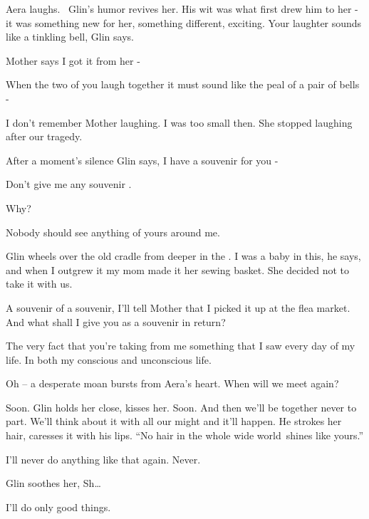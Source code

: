 \documentclass[letterpaper]{article}
\begin{document}
Aera laughs. ~Glin's humor revives her. His wit was what first drew him to her - it was something new for her, something
different, exciting. {\textquotedbl}Your laughter sounds like a tinkling bell,{\textquotedbl} Glin says.

{\textquotedbl}Mother says I got it from her -{\textquotedbl} 

{\textquotedbl}When the two of you laugh together it must sound like the peal of a pair of bells -{\textquotedbl} 

{\textquotedbl}I don't remember Mother laughing. I was too small then. She stopped laughing after our
tragedy.{\textquotedbl}

After a moment's silence Glin says, {\textquotedbl}I have a souvenir for you -{\textquotedbl} 

{\textquotedbl}Don't give me any souvenir .{\textquotedbl} 

{\textquotedbl}Why?{\textquotedbl} 

{\textquotedbl}Nobody should see anything of yours around me.{\textquotedbl} 

Glin wheels over the old cradle from deeper in the . {\textquotedbl}I was a baby in this,{\textquotedbl} he says,
{\textquotedbl}and when I outgrew it my mom made it her sewing basket. She decided not to take it with
us.{\textquotedbl} 

{\textquotedbl}A souvenir of a souvenir, I'll tell Mother that I picked it up at the flea market. And what shall I give
you as a souvenir in return?{\textquotedbl} 

{\textquotedbl}The very fact that you're taking from me something that I saw every day of my life. In both my conscious
and unconscious life.{\textquotedbl}

{\textquotedbl}Oh -- {\textquotedbl} a desperate moan bursts from Aera's heart. {\textquotedbl}When will we meet
again?{\textquotedbl} 

{\textquotedbl}Soon.{\textquotedbl} Glin holds her close, kisses her. {\textquotedbl}Soon. And then we'll be together
never to part. We'll think about it with all our might and it'll happen.{\textquotedbl} He strokes her hair, caresses
it with his lips. ``No hair in the whole wide world~shines like yours.''

{\textquotedbl}I'll never do anything like that again. Never.{\textquotedbl} 

Glin soothes her, {\textquotedbl}Sh{\dots}{\textquotedbl}~ 

{\textquotedbl}I'll do only good things.{\textquotedbl} 
\end{document}

